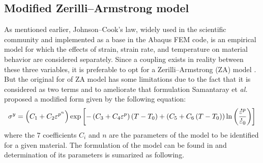 \documentclass[twoside,english,1p,final,sort&compress]{elsarticle}
\makeatletter
\theoremstyle{plain}
\newcommand{\mdot}[1]{\accentset{\mbox{\bfseries .}}{#1}}
\newcommand*{\eal}{et \emph{al.}\@\xspace}
\makeatother
\begin{document}
\subsection{Modified Zerilli--Armstrong model\label{sec:MZA}}

As mentioned earlier, Johnson--Cook's law, widely used in the scientific community and implemented as a base in the Abaqus FEM code, is an empirical model for which the effects of strain, strain rate, and temperature on material behavior are considered separately. Since a coupling exists in reality between these three variables, it is preferable to opt for a Zerilli--Armstrong (ZA) model \cite{Hull-2011-ITD}. But the original for of ZA model has some limitations due to the fact that it is considered as two terms and to ameliorate that formulation Samantaray \eal \cite{Samantaray-2009-Thermo-viscoplastic} proposed a modified form given by the following equation:  
\begin{equation}
\label{eq:MZA-model}
\sigma^y = \left(C_{1}+C_{2}\varepsilon^{p^n}\right) \exp\left[-\left(C_{3}+C_{4}\varepsilon^p\right)\left(T-T_0\right) + \left(C_{5}+C_{6}\left(T-T_0\right)\right)\ln\left( \frac{\mdot{\varepsilon}^p}{\mdot{\varepsilon}_0}\right)\right]
\end{equation}
where the $7$ coefficients $C_i$ and $n$ are the parameters of the model to be identified for a given material. The formulation of the model can be found in \cite{Samantaray-2009-Thermo-viscoplastic} and determination of its parameters is sumarized as following. 
\end{document}
